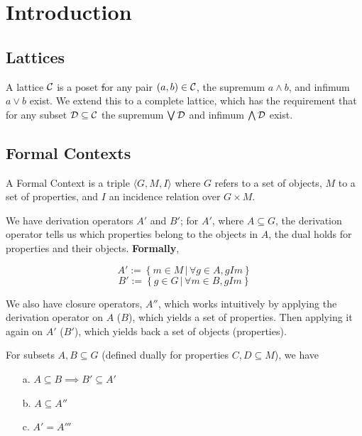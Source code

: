 \section{Introduction}
\label{sec:Introduction}
\subsection{Lattices}
\label{subsec:Introduction-Lattices}
A lattice $\mathcal{C}$ is a poset \st for any pair $(a,b) \in \mathcal{C}$, the supremum $a \land b$, and infimum $a \lor b$ exist. We extend this to a complete lattice, which has the requirement that for any subset $\mathcal{D} \subseteq \mathcal{C}$ the supremum $\bigvee \mathcal{D}$ and infimum $\bigwedge \mathcal{D}$ exist. 

\subsection{Formal Contexts}
\label{subsec:Introduction-Formal_Contexts}
A Formal Context is a triple $\langle G, M, I \rangle$ where $G$ refers to a set of objects, $M$ to a set of properties, and $I$ an incidence relation over $G\times M$. 

We have derivation operators $A'$ and $B'$; for $A'$, where $A \subseteq G$, the derivation operator tells us which properties belong to the objects in $A$, the dual holds for properties and their objects. \textbf{Formally}, 

\begin{definition}
    \[ A' := \left\{m \in M \,|\, \forall g \in A, gIm\right\} \]
    \[ B' := \left\{g \in G \,|\, \forall m \in B, gIm\right\} \]
\end{definition}

We also have closure operators, $A''$, which works intuitively by applying the derivation operator on $A$ ($B$), which yields a set of properties. Then applying it again on $A'$ ($B'$), which yields back a set of objects (properties). 

\begin{proposition}
    For subsets $A, B\subseteq G$ (defined dually for properties $C,D \subseteq M$), we have
    \begin{itemize}
        \item[a.] $A \subseteq B \implies B' \subseteq A'$ 
        \item[b.] $A \subseteq A''$ 
        \item[c.] $A' = A'''$
    \end{itemize}
\end{proposition}

